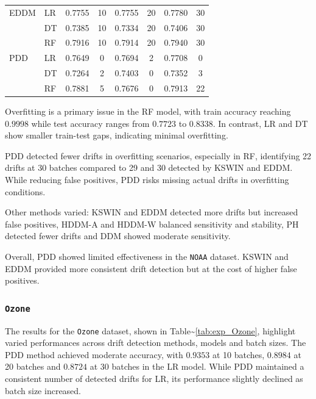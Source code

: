 \begin{table}[H]
\begin{tabular}{llcccccc}
        \midrule
        EDDM & LR & 0.7755 & 10 & 0.7755 & 20 & 0.7780 & 30 \\
        & DT & 0.7385 & 10 & 0.7334 & 20 & 0.7406 & 30 \\
        & RF & 0.7916 & 10 & 0.7914 & 20 & 0.7940 & 30 \\
        \midrule
        PDD & LR & 0.7649 & 0 & 0.7694 & 2 & 0.7708 & 0 \\
        & DT & 0.7264 & 2 & 0.7403 & 0 & 0.7352 & 3 \\
        & RF & 0.7881 & 5 & 0.7676 & 0 & 0.7913 & 22 \\
        \midrule
    \end{tabular}
\end{table}

Overfitting is a primary issue in the RF model, with train accuracy reaching \(0.9998\) while test accuracy ranges from \(0.7723\) to \(0.8338\). In contrast, LR and DT show smaller train-test gaps, indicating minimal overfitting.

PDD detected fewer drifts in overfitting scenarios, especially in RF, identifying 22 drifts at 30 batches compared to 29 and 30 detected by KSWIN and EDDM. While reducing false positives, PDD risks missing actual drifts in overfitting conditions.

Other methods varied: KSWIN and EDDM detected more drifts but increased false positives, HDDM-A and HDDM-W balanced sensitivity and stability, PH detected fewer drifts and DDM showed moderate sensitivity.

Overall, PDD showed limited effectiveness in the \texttt{NOAA} dataset. KSWIN and EDDM provided more consistent drift detection but at the cost of higher false positives.

\hypertarget{section-3}{%
\subsubsection{\texorpdfstring{\texttt{Ozone}}{}}\label{section-3}}

The results for the \texttt{Ozone} dataset, shown in Table\textasciitilde{}\ref{tab:exp_Ozone}, highlight varied performances across drift detection methods, models and batch sizes. The PDD method achieved moderate accuracy, with \(0.9353\) at 10 batches, \(0.8984\) at 20 batches and \(0.8724\) at 30 batches in the LR model. While PDD maintained a consistent number of detected drifts for LR, its performance slightly declined as batch size increased.

